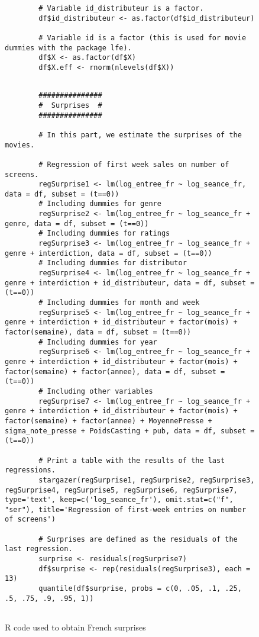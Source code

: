 \begin{appendices}
\begin{figure}[H]
\begin{lstlisting}
		# Variable id_distributeur is a factor.
		df$id_distributeur <- as.factor(df$id_distributeur)
		
		# Variable id is a factor (this is used for movie dummies with the package lfe).
		df$X <- as.factor(df$X)
		df$X.eff <- rnorm(nlevels(df$X))
		
		\end{lstlisting}
	\end{figure}
	\begin{figure}[H]
		\caption{R code used to obtain French surprises}
		\label{code_french_surprises}
		\begin{lstlisting}
		###############
		#  Surprises  #
		###############
		
		# In this part, we estimate the surprises of the movies.
		
		# Regression of first week sales on number of screens.
		regSurprise1 <- lm(log_entree_fr ~ log_seance_fr, data = df, subset = (t==0))
		# Including dummies for genre
		regSurprise2 <- lm(log_entree_fr ~ log_seance_fr + genre, data = df, subset = (t==0))
		# Including dummies for ratings 
		regSurprise3 <- lm(log_entree_fr ~ log_seance_fr + genre + interdiction, data = df, subset = (t==0))
		# Including dummies for distributor 
		regSurprise4 <- lm(log_entree_fr ~ log_seance_fr + genre + interdiction + id_distributeur, data = df, subset = (t==0))
		# Including dummies for month and week 
		regSurprise5 <- lm(log_entree_fr ~ log_seance_fr + genre + interdiction + id_distributeur + factor(mois) + factor(semaine), data = df, subset = (t==0))
		# Including dummies for year 
		regSurprise6 <- lm(log_entree_fr ~ log_seance_fr + genre + interdiction + id_distributeur + factor(mois) + factor(semaine) + factor(annee), data = df, subset = (t==0))
		# Including other variables
		regSurprise7 <- lm(log_entree_fr ~ log_seance_fr + genre + interdiction + id_distributeur + factor(mois) + factor(semaine) + factor(annee) + MoyennePresse + sigma_note_presse + PoidsCasting + pub, data = df, subset = (t==0))
		
		# Print a table with the results of the last regressions.
		stargazer(regSurprise1, regSurprise2, regSurprise3, regSurprise4, regSurprise5, regSurprise6, regSurprise7, type='text', keep=c('log_seance_fr'), omit.stat=c("f", "ser"), title='Regression of first-week entries on number of screens')
		
		# Surprises are defined as the residuals of the last regression.
		surprise <- residuals(regSurprise7)
		df$surprise <- rep(residuals(regSurprise3), each = 13)
		quantile(df$surprise, probs = c(0, .05, .1, .25, .5, .75, .9, .95, 1))
		

\end{lstlisting}
\end{figure}
\end{appendices}
